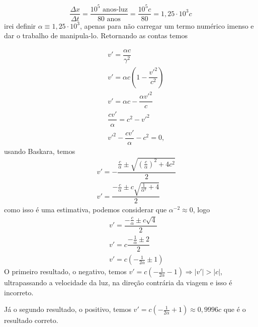 \documentclass[10pt,a4paper]{article}
\begin{document}
	\begin{equation}\nonumber
		\dfrac{\Delta x}{\Delta t } = \dfrac{10^5 \text{  anos-luz}}{80\text{ anos}} = \dfrac{10^5c}{80} = 1,25\cdot10^3c
	\end{equation}
	irei definir $ \alpha\equiv 1,25\cdot10^3 $, apenas para não carregar um termo numérico imenso e dar o trabalho de manipula-lo. Retornando as contas temos
	
	\begin{eqnarray}
	    && v' = \dfrac{\alpha c}{\gamma^2}\nonumber \\
		&& v' = \alpha c \left( 1 - \dfrac{v'^2}{c^2}\right) \nonumber \\
		&& v'  =  \alpha c - \dfrac{ \alpha v'^2}{c} \nonumber \\		
		&& \dfrac{ c v'}{\alpha} = c^2 - v'^2 \nonumber \\
		&& v'^2 - \dfrac{ c v'}{\alpha} - c^2 = 0, \nonumber
	\end{eqnarray}
	usando Baskara, temos
	\begin{eqnarray}
		&& v' = -\dfrac{\frac{c}{\alpha} \pm \sqrt{\left(\frac{c}{\alpha}\right)^2 +4c^2}}{2} \nonumber \\
		&& v' = \dfrac{-\frac{c}{\alpha} \pm c\sqrt{\frac{1}{\alpha^2} +4}}{2} \nonumber 
	\end{eqnarray}
	como isso é uma estimativa, podemos considerar que $ \alpha^{-2} \approx 0 $, logo
	\begin{eqnarray}
		&& v' = \dfrac{-\frac{c}{\alpha} \pm c\sqrt{4}}{2} \nonumber \\
		&& v' = c\dfrac{-\frac{1}{\alpha} \pm 2}{2} \nonumber\\
		&& v' = c\left(-\frac{1}{2\alpha} \pm 1\right) \nonumber 
	\end{eqnarray}
	O primeiro resultado, o negativo, temos
	$ v' = c\left(-\frac{1}{2\alpha} - 1\right) \Longrightarrow |v'| > |c|$, ultrapassando a velocidade da luz, na direção contrária da viagem e isso é incorreto.
	
	Já o segundo resultado, o positivo, temos
	$ v' = c\left(-\frac{1}{2\alpha} + 1\right) \approx 0,9996 c$ que é o resultado correto.
\end{document}
